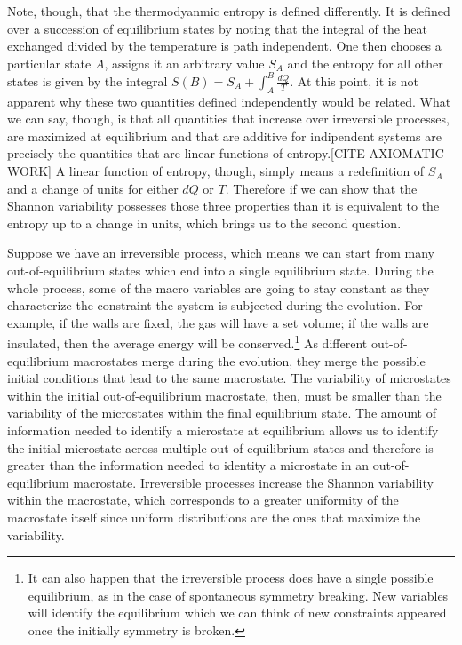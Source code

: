 \documentclass{article}
\begin{document}
Note, though, that the thermodyanmic entropy is defined differently. It is defined over a succession of equilibrium states by noting that the integral of the heat exchanged divided by the temperature is path independent. One then chooses a particular state $A$, assigns it an arbitrary value $S_A$ and the entropy for all other states is given by the integral $S(B) = S_A + \int_A^B \frac{dQ}{T}$. At this point, it is not apparent why these two quantities defined independently would be related. What we can say, though, is that all quantities that increase over irreversible processes, are maximized at equilibrium and that are additive for indipendent systems are precisely the quantities that are linear functions of entropy.[CITE AXIOMATIC WORK] A linear function of entropy, though, simply means a redefinition of $S_A$ and a change of units for either $dQ$ or $T$. Therefore if we can show that the Shannon variability possesses those three properties than it is equivalent to the entropy up to a change in units, which brings us to the second question.

Suppose we have an irreversible process, which means we can start from many out-of-equilibrium states which end into a single equilibrium state. During the whole process, some of the macro variables are going to stay constant as they characterize the constraint the system is subjected during the evolution. For example, if the walls are fixed, the gas will have a set volume; if the walls are insulated, then the average energy will be conserved.\footnote{It can also happen that the irreversible process does have a single possible equilibrium, as in the case of spontaneous symmetry breaking. New variables will identify the equilibrium which we can think of new constraints appeared once the initially symmetry is broken.} As different out-of-equilibrium macrostates merge during the evolution, they merge the possible initial conditions that lead to the same macrostate. The variability of microstates within the initial out-of-equilibrium macrostate, then, must be smaller than the variability of the microstates within the final equilibrium state. The amount of information needed to identify a microstate at equilibrium allows us to identify the initial microstate across multiple out-of-equilibrium states and therefore is greater than the information needed to identity a microstate in an out-of-equilibrium macrostate. Irreversible processes increase the Shannon variability within the macrostate, which corresponds to a greater uniformity of the macrostate itself since uniform distributions are the ones that maximize the variability.
\end{document}
